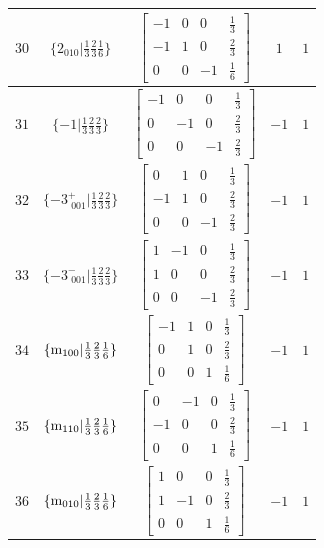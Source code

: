 \documentclass[fleqn,8pt]{jsarticle}
\begin{document}
\begin{longtable}{ccccc}
$ 30 $ & $ \{2{}_{010}|\frac{1}{3} \frac{2}{3} \frac{1}{6}\} $ & $ \begin{bmatrix} -1 & 0 & 0 & \frac{1}{3} \\ -1 & 1 & 0 & \frac{2}{3} \\ 0 & 0 & -1 & \frac{1}{6} \end{bmatrix} $ & $ 1 $ & $ 1 $ \\ \hline
$ 31 $ & $ \{-1|\frac{1}{3} \frac{2}{3} \frac{2}{3}\} $ & $ \begin{bmatrix} -1 & 0 & 0 & \frac{1}{3} \\ 0 & -1 & 0 & \frac{2}{3} \\ 0 & 0 & -1 & \frac{2}{3} \end{bmatrix} $ & $ -1 $ & $ 1 $ \\ \hline
$ 32 $ & $ \{-3^{+}_{\,\,001}|\frac{1}{3} \frac{2}{3} \frac{2}{3}\} $ & $ \begin{bmatrix} 0 & 1 & 0 & \frac{1}{3} \\ -1 & 1 & 0 & \frac{2}{3} \\ 0 & 0 & -1 & \frac{2}{3} \end{bmatrix} $ & $ -1 $ & $ 1 $ \\ \hline
$ 33 $ & $ \{-3^{-}_{\,\,001}|\frac{1}{3} \frac{2}{3} \frac{2}{3}\} $ & $ \begin{bmatrix} 1 & -1 & 0 & \frac{1}{3} \\ 1 & 0 & 0 & \frac{2}{3} \\ 0 & 0 & -1 & \frac{2}{3} \end{bmatrix} $ & $ -1 $ & $ 1 $ \\ \hline
$ 34 $ & $ \{{\rm m}_{100}|\frac{1}{3} \frac{2}{3} \frac{1}{6}\} $ & $ \begin{bmatrix} -1 & 1 & 0 & \frac{1}{3} \\ 0 & 1 & 0 & \frac{2}{3} \\ 0 & 0 & 1 & \frac{1}{6} \end{bmatrix} $ & $ -1 $ & $ 1 $ \\ \hline
$ 35 $ & $ \{{\rm m}_{110}|\frac{1}{3} \frac{2}{3} \frac{1}{6}\} $ & $ \begin{bmatrix} 0 & -1 & 0 & \frac{1}{3} \\ -1 & 0 & 0 & \frac{2}{3} \\ 0 & 0 & 1 & \frac{1}{6} \end{bmatrix} $ & $ -1 $ & $ 1 $ \\ \hline
$ 36 $ & $ \{{\rm m}_{010}|\frac{1}{3} \frac{2}{3} \frac{1}{6}\} $ & $ \begin{bmatrix} 1 & 0 & 0 & \frac{1}{3} \\ 1 & -1 & 0 & \frac{2}{3} \\ 0 & 0 & 1 & \frac{1}{6} \end{bmatrix} $ & $ -1 $ & $ 1 $ \\
\end{longtable}
\end{document}
